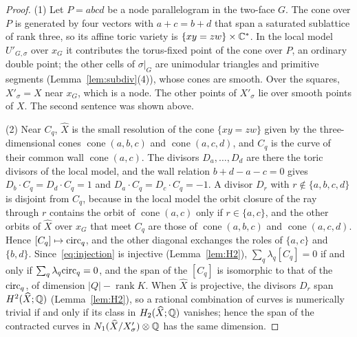 \begin{proof}
(1) Let $P=abcd$ be a node parallelogram in the two-face $G$. The cone over $P$ is generated by four vectors with
$a+c=b+d$ that span a saturated sublattice of rank three, so its affine toric variety is $\{xy=zw\}\times\mathbb C^*$. In the local
model $U'_{G,\sigma}$ over $x_G$ it contributes the torus-fixed point of the cone over $P$, an ordinary double point; the
other cells of $\sigma|_G$ are unimodular triangles and primitive segments (Lemma~\ref{lem:subdiv}(4)), whose cones are
smooth. Over the squares, $X'_\sigma=X$ near $x_G$, which is a node. The other points of $X'_\sigma$ lie over smooth points of
$X$. The second sentence was shown above.

(2) Near $C_q$, $\widehat X$ is the small resolution of the cone $\{xy=zw\}$ given by the three-dimensional cones
$\operatorname{cone}(a,b,c)$ and $\operatorname{cone}(a,c,d)$, and $C_q$ is the curve of their common wall
$\operatorname{cone}(a,c)$. The divisors $D_a,\dots,D_d$ are there the toric divisors of the local model, and the wall
relation $b+d-a-c=0$ gives $D_b\cdot C_q=D_d\cdot C_q=1$ and $D_a\cdot C_q=D_c\cdot C_q=-1$. A divisor $D_r$ with
$r\notin\{a,b,c,d\}$ is disjoint from $C_q$, because in the local model the orbit closure of the ray through $r$ contains
the orbit of $\operatorname{cone}(a,c)$ only if $r\in\{a,c\}$, and the other orbits of $\widehat X$ over $x_G$ that meet
$C_q$ are those of $\operatorname{cone}(a,b,c)$ and $\operatorname{cone}(a,c,d)$. Hence $[C_q]\mapsto\mathrm{circ}_q$, and the
other diagonal exchanges the roles of $\{a,c\}$ and $\{b,d\}$. Since~\eqref{eq:injection} is injective
(Lemma~\ref{lem:H2}), $\sum_q\lambda_q[C_q]=0$ if and only if $\sum_q\lambda_q\mathrm{circ}_q=0$, and the span of the $[C_q]$ is
isomorphic to that of the $\mathrm{circ}_q$, of dimension $|Q|-\operatorname{rank}K$. When $\widehat X$ is projective, the divisors $D_r$
span $H^2(\widehat X;\mathbb Q)$ (Lemma~\ref{lem:H2}), so a rational combination of curves is numerically trivial if and only if its class in
$H_2(\widehat X;\mathbb Q)$ vanishes; hence the span of the contracted curves in $N_1(\widehat X/X'_\sigma)\otimes\mathbb Q$ has the same
dimension.


\end{proof}
